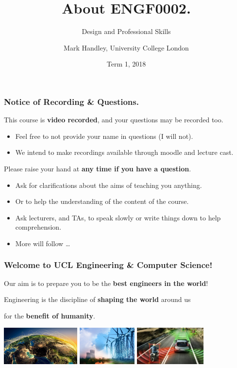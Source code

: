 \documentclass{beamer} %
\author{Mark Handley, University College London}
\title{About ENGF0002.}
\subtitle{Design and Professional Skills }
\date{Term 1, 2018}
\newcommand\emc[1]{\textcolor{midred}{\textbf{#1}}}
\begin{document}
\nobibliography*


\frame{
\titlepage
}

\begin{frame}
\frametitle{Notice of Recording \& Questions.}

This course is \emc{video recorded}, and your questions may be recorded too. 
\begin{itemize}
    \item Feel free to not provide your name in questions (I will not).
    \item We intend to make recordings available through moodle and lecture cast.
\end{itemize}

\vspace{3mm}
Please raise your hand at \emc{any time if you have a question}.
\begin{itemize}
    \item Ask for clarifications about the aims of teaching you anything.
    \item Or to help the understanding of the content of the course.
    \item Ask lecturers, and TAs, to speak slowly or write things down to help comprehension.
    \item More will follow \ldots
\end{itemize}

\end{frame} 


\begin{frame}
\frametitle{Welcome to UCL Engineering \& Computer Science!}

Our aim is to prepare you to be the \emc{best engineers in the world}!

\vspace{10mm}
Engineering is the discipline of \emc{shaping the world} around us 

for the \emc{benefit of humanity}.

\vspace{5mm}
\centering
\includegraphics[height=20mm]{img/internet.jpg} \quad
\includegraphics[height=20mm]{img/power.jpg} \quad
\includegraphics[height=20mm]{img/cars.jpg}

\end{frame}
\end{document}
